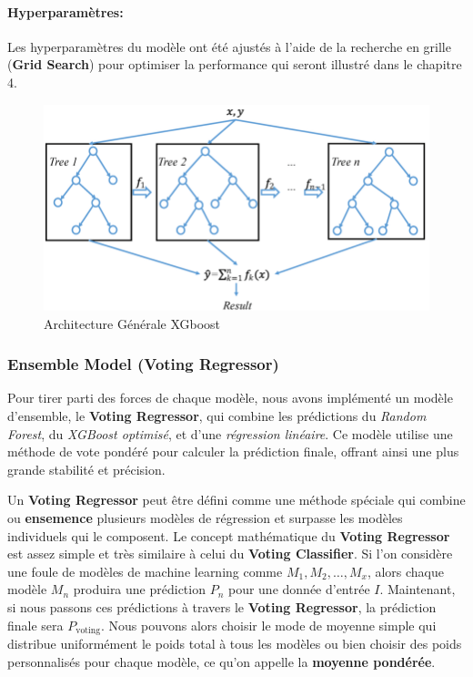 \paragraph*{Hyperparamètres:}
Les hyperparamètres du modèle ont été ajustés à l'aide de la recherche en grille (\textbf{Grid Search}) pour optimiser la performance qui seront illustré dans le chapitre 4.

\begin{figure}[h!]
	\centering
	\includegraphics[width=0.7\linewidth]{images/schema_xgboost}
	\caption{Architecture Générale XGboost}
	\label{fig:schemaxgboost}
\end{figure}


\subsubsection{Ensemble Model (Voting Regressor)}

Pour tirer parti des forces de chaque modèle, nous avons implémenté un modèle d'ensemble, le \textbf{Voting Regressor}, qui combine les prédictions du \textit{Random Forest}, du \textit{XGBoost optimisé}, et d'une \textit{régression linéaire}. Ce modèle utilise une méthode de vote pondéré pour calculer la prédiction finale, offrant ainsi une plus grande stabilité et précision.

Un \textbf{Voting Regressor} peut être défini comme une méthode spéciale qui combine ou \textbf{ensemence} plusieurs modèles de régression et surpasse les modèles individuels qui le composent. Le concept mathématique du \textbf{Voting Regressor} est assez simple et très similaire à celui du \textbf{Voting Classifier}. Si l'on considère une foule de modèles de machine learning comme \(M_1, M_2,\dots , M_x\), alors chaque modèle \(M_n\) produira une prédiction \(P_n\) pour une donnée d'entrée \(I\). Maintenant, si nous passons ces prédictions à travers le \textbf{Voting Regressor}, la prédiction finale sera \(P_{\text{voting}}\). Nous pouvons alors choisir le mode de moyenne simple qui distribue uniformément le poids total à tous les modèles ou bien choisir des poids personnalisés pour chaque modèle, ce qu'on appelle la \textbf{moyenne pondérée}.

